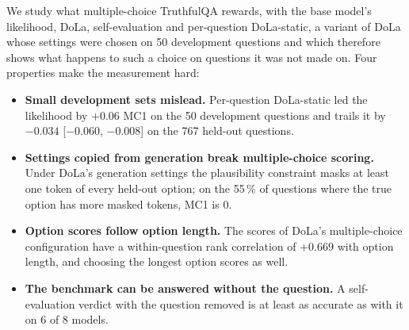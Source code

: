 \documentclass[11pt]{article}
\newcommand{\cha}[1]{\textsf{C#1}}
\newcommand{\method}{per-question DoLa-static}
\newcommand{\Method}{Per-question DoLa-static}
\begin{document}
We study what multiple-choice TruthfulQA rewards, with the base model's likelihood, DoLa, self-evaluation and
\method{}, a variant of DoLa whose settings were chosen on 50 development questions and which therefore shows what
happens to such a choice on questions it was not made on. Four properties make the measurement hard:
\begin{itemize}
\item[\cha1] \textbf{Small development sets mislead.} \Method{} led the likelihood by $+0.06$ MC1 on the 50
  development questions and trails it by $-0.034$ [$-0.060$, $-0.008$] on the 767 held-out questions.
\item[\cha2] \textbf{Settings copied from generation break multiple-choice scoring.} Under DoLa's generation
  settings the plausibility constraint masks at least one token of every held-out option; on the 55\,\% of
  questions where the true option has more masked tokens, MC1 is 0.
\item[\cha3] \textbf{Option scores follow option length.} The scores of DoLa's multiple-choice configuration have a
  within-question rank correlation of $+0.669$ with option length, and choosing the longest option scores as well.
\item[\cha4] \textbf{The benchmark can be answered without the question.} A self-evaluation verdict with the
  question removed is at least as accurate as with it on 6 of 8 models.
\end{itemize}
\end{document}
